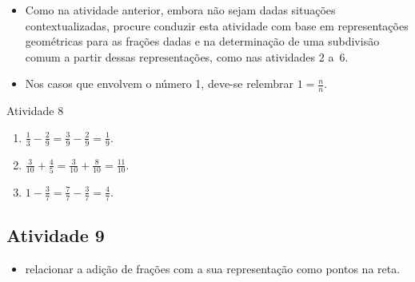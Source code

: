 \begin{multicols}{2}
   \vspace{.15cm}

  \begin{itemize} %
    \item       Como na atividade anterior, embora não sejam dadas situações contextualizadas, procure conduzir esta atividade com base em representações geométricas para as frações dadas e na determinação de uma subdivisão comum a partir dessas representações, como nas atividades 2 a~6.
    \item  Nos casos que envolvem o número 1, deve-se relembrar   $1 = \frac{n}{n}$.
  \end{itemize} %

\begin{resposta*}{Atividade 8}

\begin{enumerate} [\quad a)] %
    \item             $\frac{1}{3} - \frac{2}{9} = \frac{3}{9} - \frac{2}{9} = \frac{1}{9}$.
    \item             $\frac{3}{10}+\frac{4}{5} = \frac{3}{10}+\frac{8}{10} =\frac{11}{10}$.
    \item             $1 - \frac{3}{7} = \frac{7}{7} - \frac{3}{7} = \frac{4}{7}$.
\end{enumerate} %


\end{resposta*}



\end{multicols}

\subsection{Atividade 9}

 \vspace{.15cm}

\begin{itemize} %
  \item     relacionar a adição de frações com a sua representação como pontos na reta.
\end{itemize} %
\vspace{.15cm}

 \vspace{.15cm}

